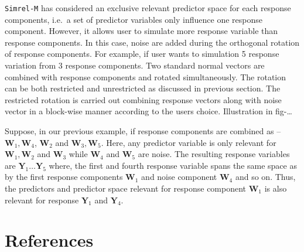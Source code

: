 \documentclass[12pt,A4paper,authoryear]{elsarticle} %
\begin{document}
\texttt{Simrel-M} has considered an exclusive relevant predictor space
for each response components, i.e.~a set of predictor variables only
influence one response component. However, it allows user to simulate
more response variable than response components. In this case, noise are
added during the orthogonal rotation of response components. For
example, if user wants to simulation 5 response variation from 3
response components. Two standard normal vectors are combined with
response components and rotated simultaneously. The rotation can be both
restricted and unrestricted as discussed in previous section. The
restricted rotation is carried out combining response vectors along with
noise vector in a block-wise manner according to the users choice.
Illustration in fig-\ldots{}

Suppose, in our previous example, if response components are combined as
-- \(\mathbf{W}_1, \mathbf{W}_4\), \(\mathbf{W}_2\) and
\(\mathbf{W}_3, \mathbf{W}_5\). Here, any predictor variable is only
relevant for \(\mathbf{W}_1, \mathbf{W}_2\) and \(\mathbf{W}_3\) while
\(\mathbf{W}_4\) and \(\mathbf{W}_5\) are noise. The resulting response
variables are \(\mathbf{Y}_1 \ldots \mathbf{Y}_5\) where, the first and
fourth response variable spans the same space as by the first response
components \(\mathbf{W}_1\) and noise component \(\mathbf{W}_4\) and so
on. Thus, the predictors and predictor space relevant for response
component \(\mathbf{W}_1\) is also relevant for response
\(\mathbf{Y}_1\) and \(\mathbf{Y}_4\).

\section*{References}\label{references}


\renewcommand\refname{References}

\end{document}
